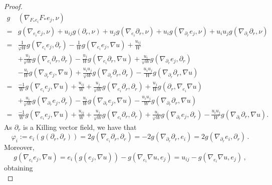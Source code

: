 \documentclass[10pt,a4paper]{amsart}
\begin{document}
\begin{proof}
\begin{align*}
   g& \left( \nabla_{F_* e_i} F_* e_j , \nu \right)  \\ =& g\left(\nabla_{e_i}e_j,\nu\right)
    +u_{ij}g\left(\partial_r,\nu\right)
    +u_j g\left(\nabla_{e_i} \partial_r,\nu\right)
    +u_i g\left(\nabla_{\partial_r} e_j,\nu\right)
    +u_i u_j g\left(\nabla_{\partial_r} \partial_r,\nu\right) \\
  =  & \frac{1}{\varphi W} g\left(\nabla_{e_i}e_j,\partial_r\right)
    -\frac{1}{W}g\left(\nabla_{e_i}e_j,\nabla u\right)  +\frac{u_{ij}}{W} \\
     & +\frac{u_j}{\varphi W}g\left(\nabla_{e_i}\partial_r,\partial_r\right)
    -\frac{u_j}{W}g\left(\nabla_{e_i}\partial_r,\nabla u\right)
     +\frac{u_i}{\varphi W}g\left(\nabla_{\partial_r}e_j,\partial_r\right) \\
    &-\frac{u_i}{W}g\left(\nabla_{\partial_r}e_j,\nabla u\right)
    + \frac{u_iu_j}{\varphi W}g(\nabla_{\partial_r}\partial_r,\partial_r) - \frac{u_iu_j}{W} g(\nabla_{\partial_r}\partial_r,\nabla u)\\
    = &\frac{-1}{W}g\left(\nabla_{e_i}e_j,\nabla u\right)+\frac{u_{ij}}{W}
    +\frac{u_j}{\varphi W}g\left(\nabla_{e_i}\partial_r,\partial_r\right)
    +\frac{u_j}{W}g\left(\partial_r,\nabla_{e_i}\nabla u\right)\\
    &+\frac{u_i}{\varphi W} g\left(\nabla_{\partial_r}e_j,\partial_r\right)-\frac{u_i}{W}g\left(\nabla_{\partial_r}e_j,\nabla u\right)-\frac{u_iu_j}{W}g\left(\nabla_{\partial_r} \partial_r,\nabla u\right)\\
    =& \frac{-1}{W}g\left(\nabla_{e_i}e_j,\nabla u\right)
    +\frac{u_{ij}}{W}+\frac{u_j}{\varphi W}g\left(\nabla_{e_i}\partial_r,\partial_r\right)
    +\frac{u_i}{\varphi W}g\left(\nabla_{\partial_r}e_j,\partial_r\right)
    -\frac{u_iu_j}{W}g\left(\nabla_{\partial_r} \partial_r,\nabla u\right).
    \end{align*}
As $\partial_r$ is a Killing vector field, we have that
\begin{equation}\label{eq:ci}
\varphi_i:=e_i(g(\partial_r,\partial_r))=2g\left(\nabla_{e_i}\partial_r,\partial_r\right)=-2g\left(\nabla_{\partial_r} \partial_r,e_i\right)=2g\left(\nabla_{\partial_r}e_i,\partial_r\right) \, .
\end{equation}
Moreover,
\[g\left(\nabla_{e_i}e_j,\nabla u\right)
=e_i(g(e_j,\nabla u))-g\left(\nabla_{e_i}\nabla u,e_j\right)=u_{ij}-g(\nabla_{e_i}\nabla u,e_j) \, , \]
obtaining
\begin{equation}

\end{equation}
\end{proof}
\end{document}

